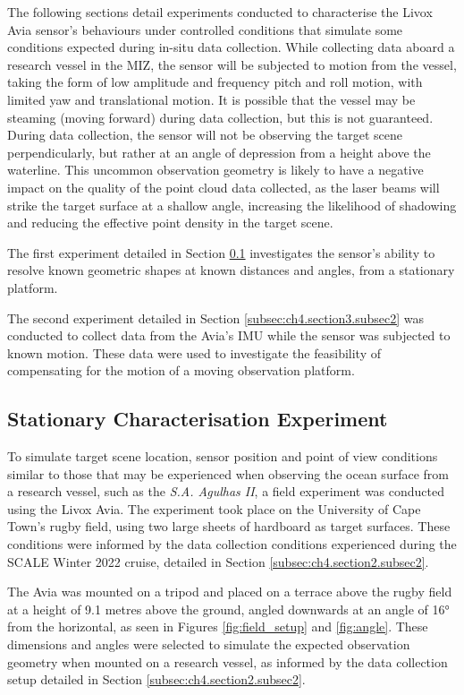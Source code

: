 The following sections detail experiments conducted to characterise the Livox Avia sensor's behaviours under controlled conditions that simulate some conditions expected during in-situ data collection. While collecting data aboard a research vessel in the \ac{MIZ}, the sensor will be subjected to motion from the vessel, taking the form of low amplitude and frequency pitch and roll motion, with limited yaw and translational motion. It is possible that the vessel may be steaming (moving forward) during data collection, but this is not guaranteed. During data collection, the sensor will not be observing the target scene perpendicularly, but rather at an angle of depression from a height above the waterline. This uncommon observation geometry is likely to have a negative impact on the quality of the point cloud data collected, as the laser beams will strike the target surface at a shallow angle, increasing the likelihood of shadowing and reducing the effective point density in the target scene.

The first experiment detailed in Section \ref{subsec:ch4.section3.subsec1} investigates the sensor's ability to resolve known geometric shapes at known distances and angles, from a stationary platform. 

The second experiment detailed in Section \ref{subsec:ch4.section3.subsec2} was conducted to collect data from the Avia's \ac{IMU} while the sensor was subjected to known motion. These data were used to investigate the feasibility of compensating for the motion of a moving observation platform.

\subsection{Stationary Characterisation Experiment}
\label{subsec:ch4.section3.subsec1}

To simulate target scene location, sensor position and point of view conditions similar to those that may be experienced when observing the ocean surface from a research vessel, such as the \textit{S.A. Agulhas II}, a field experiment was conducted using the Livox Avia. The experiment took place on the University of Cape Town's rugby field, using two large sheets of hardboard as target surfaces. These conditions were informed by the data collection conditions experienced during the \ac{SCALE} Winter 2022 cruise, detailed in Section \ref{subsec:ch4.section2.subsec2}.

The Avia was mounted on a tripod and placed on a terrace above the rugby field at a height of 9.1 metres above the ground, angled downwards at an angle of 16° from the horizontal, as seen in Figures \ref{fig:field_setup} and \ref{fig:angle}. These dimensions and angles were selected to simulate the expected observation geometry when mounted on a research vessel, as informed by the data collection setup detailed in Section \ref{subsec:ch4.section2.subsec2}.

